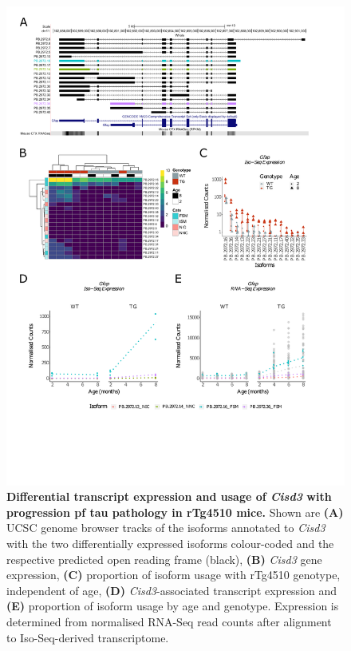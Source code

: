 \newpage
\begin{figure}[!htp]
	\centering
	\includegraphics[page=4,trim={1.5cm 3.5cm 2cm 1cm}, scale = 0.80]{Figures/Ch5_DiffPlots.pdf}
	\captionsetup{width=0.95\textwidth}
	\caption[Differential \textit{Cisd3} transcript expression and usage]%
	{\textbf{Differential transcript expression and usage of \textit{Cisd3} with progression pf tau pathology in rTg4510 mice.} Shown are \textbf{(A)} UCSC genome browser tracks of the isoforms annotated to \textit{Cisd3} with the two differentially expressed isoforms colour-coded and the respective predicted open reading frame (black), \textbf{(B)} \textit{Cisd3} gene expression, \textbf{(C)} proportion of isoform usage with rTg4510 genotype, independent of age, \textbf{(D)} \textit{Cisd3}-associated transcript expression and \textbf{(E)} proportion of isoform usage by age and genotype. Expression is determined from normalised RNA-Seq read counts after alignment to Iso-Seq-derived transcriptome.}    
	\label{fig:DIU_Cisd3}
\end{figure}

